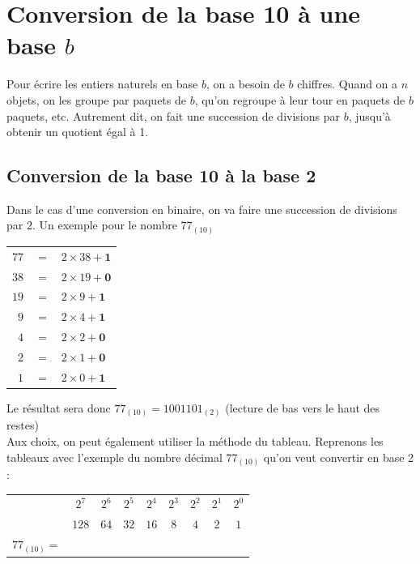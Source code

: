 
\section{Conversion de la base 10 à une base $b$}

Pour écrire les entiers naturels en base $b$, on a besoin de $b$ chiffres. Quand on a $n$ objets, on les groupe par paquets de $b$, qu'on regroupe à leur tour en paquets de $b$ paquets, etc. Autrement dit, on fait une succession de divisions par $b$, jusqu'à obtenir un quotient égal à 1.

\subsection*{Conversion de la base 10 à la base 2}
Dans le cas d'une conversion en binaire, on va faire une succession de divisions par 2.
Un exemple pour le nombre $77_{(10)}$\\
\begin{center}
\begin{tabular}{rcl}
$77$ & $=$ & $2\times 38 + \mathbf{1}$\\
$38$ & $=$ & $2\times 19 + \mathbf{0}$\\
$19$ & $=$ & $2\times 9 + \mathbf{1}$\\
$9$ & $=$ & $2\times 4 + \mathbf{1}$\\
$4$ & $=$ & $2\times 2 + \mathbf{0}$\\
$2$ & $=$ & $2\times 1 + \mathbf{0}$\\
$1$ & $=$ & $2\times 0 + \mathbf{1}$\\
\end{tabular}
\end{center}
Le résultat sera donc $77_{(10)} = 1001101_{(2)}$ (lecture de bas vers le haut des restes)\\

Aux choix, on peut également utiliser la méthode du tableau. Reprenons les tableaux avec l'exemple du nombre décimal $77_{(10)}$ qu'on veut convertir en base 2 :
\begin{center}
\begin{tabular}{lcccccccc}
    & $2^7$ & $2^6$ & $2^5$ & $2^4$ & $2^3$ & $2^2$ & $2^1$ & $2^0$\\
    & $128$ & $64$ & $32$ & $16$ & $8$ & $4$ & $2$ & $1$\\
    \hline
    $77_{(10)} = $ &  &  &  &  &  &  &  & \\
    \end{tabular}
\end{center}

